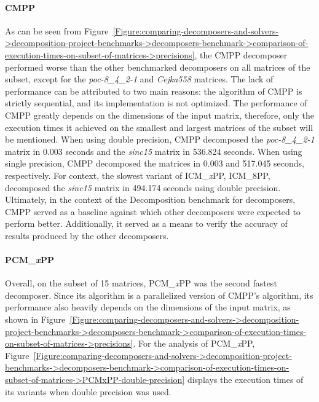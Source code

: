 \paragraph{CMPP} As can be seen from Figure~\ref{Figure:comparing-decomposers-and-solvers->decomposition-project-benchmarks->decomposers-benchmark->comparison-of-execution-times-on-subset-of-matrices->precisions}, the CMPP decomposer performed worse than the other benchmarked decomposers on all matrices of the subset, except for the \textit{poc-8\_4\_2-1} and \textit{Cejka558} matrices.
The lack of performance can be attributed to two main reasons: the algorithm of CMPP is strictly sequential, and its implementation is not optimized.
The performance of CMPP greatly depends on the dimensions of the input matrix, therefore, only the execution times it achieved on the smallest and largest matrices of the subset will be mentioned.
When using double precision, CMPP decomposed the \textit{poc-8\_4\_2-1} matrix in 0.003 seconds and the \textit{sinc15} matrix in 536.824 seconds.
When using single precision, CMPP decomposed the matrices in 0.003 and 517.045 seconds, respectively.
For context, the slowest variant of ICM\_\textit{x}PP, ICM\_8PP, decomposed the \textit{sinc15} matrix in 494.174 seconds using double precision.
Ultimately, in the context of the Decomposition benchmark for decomposers, CMPP served as a baseline against which other decomposers were expected to perform better.
Additionally, it served as a means to verify the accuracy of results produced by the other decomposers.

\paragraph{PCM\_\textit{x}PP}\label{Paragraph:comparing-decomposers-and-solvers->decomposition-project-benchmarks->decomposers-benchmark->comparison-of-execution-times-on-subset-of-matrices->PCMxPP} Overall, on the subset of 15 matrices, PCM\_\textit{x}PP was the second fastest decomposer.
Since its algorithm is a parallelized version of CMPP's algorithm, its performance also heavily depends on the dimensions of the input matrix, as shown in Figure~\ref{Figure:comparing-decomposers-and-solvers->decomposition-project-benchmarks->decomposers-benchmark->comparison-of-execution-times-on-subset-of-matrices->precisions}.
For the analysis of PCM\_\textit{x}PP, Figure~\ref{Figure:comparing-decomposers-and-solvers->decomposition-project-benchmarks->decomposers-benchmark->comparison-of-execution-times-on-subset-of-matrices->PCMxPP-double-precision} displays the execution times of its variants when double precision was used.

